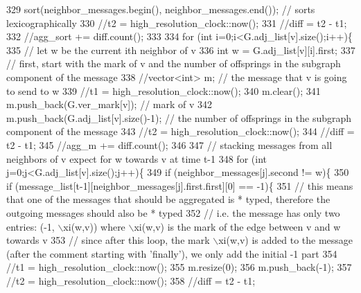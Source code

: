 \begin{DoxyCode}
329 \textcolor{comment}{        sort(neighbor\_messages.begin(), neighbor\_messages.end()); // sorts lexicographically}
330 \textcolor{comment}{        //t2 = high\_resolution\_clock::now();}
331 \textcolor{comment}{        //diff = t2 - t1;}
332 \textcolor{comment}{        //agg\_sort += diff.count();}
333 \textcolor{comment}{}
334 \textcolor{comment}{        for (int i=0;i<G.adj\_list[v].size();i++)\{}
335 \textcolor{comment}{          // let w be the current ith neighbor of v}
336 \textcolor{comment}{          int w = G.adj\_list[v][i].first;}
337 \textcolor{comment}{          // first, start with the mark of v and the number of offsprings in the subgraph component of the
       message}
338 \textcolor{comment}{          //vector<int> m; // the message that v is going to send to w}
339 \textcolor{comment}{          //t1 = high\_resolution\_clock::now();}
340 \textcolor{comment}{          m.clear();}
341 \textcolor{comment}{          m.push\_back(G.ver\_mark[v]); // mark of v}
342 \textcolor{comment}{          m.push\_back(G.adj\_list[v].size()-1); // the number of offsprings in the subgraph component of the
       message}
343 \textcolor{comment}{          //t2 = high\_resolution\_clock::now();}
344 \textcolor{comment}{          //diff = t2 - t1;}
345 \textcolor{comment}{          //agg\_m += diff.count();}
346 \textcolor{comment}{}
347 \textcolor{comment}{          // stacking messages from all neighbors of v expect for w towards v at time t-1}
348 \textcolor{comment}{          for (int j=0;j<G.adj\_list[v].size();j++)\{}
349 \textcolor{comment}{            if (neighbor\_messages[j].second != w)\{}
350 \textcolor{comment}{              if (message\_list[t-1][neighbor\_messages[j].first.first][0] == -1)\{}
351 \textcolor{comment}{                // this means that one of the messages that should be aggregated is * typed, therefore the
       outgoing messages should also be * typed}
352 \textcolor{comment}{                // i.e. the message has only two entries: (-1, \(\backslash\)xi(w,v)) where \(\backslash\)xi(w,v) is the mark of the
       edge between v and w towards v}
353 \textcolor{comment}{                // since after this loop, the mark \(\backslash\)xi(w,v) is added to the message (after the comment
       starting with 'finally'), we only add the initial -1 part}
354 \textcolor{comment}{                //t1 = high\_resolution\_clock::now();}
355 \textcolor{comment}{                m.resize(0);}
356 \textcolor{comment}{                m.push\_back(-1);}
357 \textcolor{comment}{                //t2 = high\_resolution\_clock::now();}
358 \textcolor{comment}{                //diff = t2 - t1;}

\end{DoxyCode}
